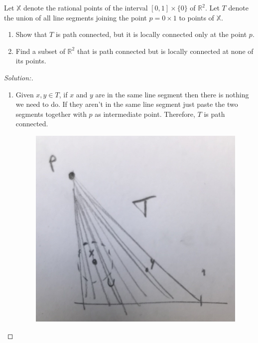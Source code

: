 \documentclass[a4paper,12pt, reqno]{article}
\theoremstyle{definition}
\newenvironment{exerr}[1]{
  \renewcommand\theexeralt{#1}
  \exeralt
}{\endexeralt}
\newenvironment{solution}{\begin{proof}[Solution:]}{\end{proof}}
\newcommand{\R}{\mathbb{R}}
\newcommand{\X}{\mathbb{X}}
\begin{document}
\begin{exerr}{5}
  Let $\X$ denote the rational points of the interval $[0,1]\times\{ 0 \}$ of $\R^2$. Let $T$ denote the union of all line segments joining the point $p=0\times 1$ to points of $\X$.
  \begin{enumerate}[label=(\alph*)]
    \item Show that $T$ is path connected, but it is locally connected only at the point $p$.
    \item Find a subset of $\R^2$ that is path connected but is locally connected at none of its points.
  \end{enumerate}
\end{exerr}
\begin{solution}\hfill
  \begin{enumerate}[label=(\alph*)]
    \item Given $x,y\in T$, if $x$ and $y$ are in the same line segment then there is nothing we need to do. If they aren't in the same line segment just paste the two segments together with $p$ as intermediate point. Therefore, $T$ is path connected.
    \begin{figure}[H]
      \centering
      \includegraphics[scale=0.05]{Images/25-5-a.jpg}
    \end{figure}
    

\end{enumerate}
\end{solution}
\end{document}
